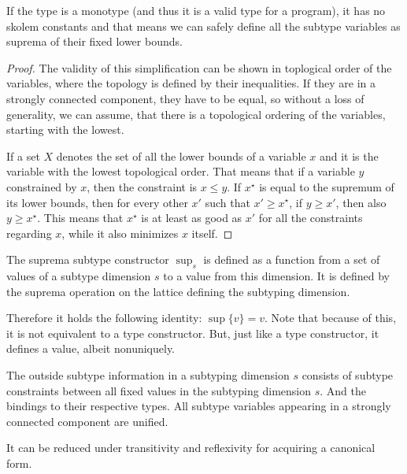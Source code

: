 \begin{remark}
    If the type is a monotype (and thus it is a valid type for a program), it has no skolem constants and that means we can safely define all the subtype variables as suprema of their fixed lower bounds.
\end{remark}

\begin{lemma}
    \label{suprema-subtyping}
\end{lemma}

\begin{proof}
The validity of this simplification can be shown in toplogical order of the variables, where the topology is defined by their inequalities. If they are in a strongly connected component, they have to be equal, so without a loss of generality, we can assume, that there is a topological ordering of the variables, starting with the lowest.

If a set $X$ denotes the set of all the lower bounds of a variable $x$ and it is the variable with the lowest topological order. That means that if a variable $y$ constrained by $x$, then the constraint is $x \leq y$. If $x^\star$ is equal to the supremum of its lower bounds, then for every other $x'$ such that $x' \geq x^\star$, if $y \geq x'$, then also $y \geq x^\star$. This means that $x^\star$ is at least as good as $x'$ for all the constraints regarding $x$, while it also minimizes $x$ itself.
\end{proof}

\begin{defn}
    The suprema subtype constructor $\sup_s$ is defined as a function from a set of values of a subtype dimension $s$ to a value from this dimension. It is defined by the suprema operation on the lattice defining the subtyping dimension.

    Therefore it holds the following identity: $\sup \{v\} = v$. Note that because of this, it is not equivalent to a type constructor. But, just like a type constructor, it defines a value, albeit nonuniquely.
\end{defn}

\begin{defn}
    The outside subtype information in a subtyping dimension $s$ consists of subtype constraints between all fixed values in the subtyping dimension $s$. And the bindings to their respective types. All subtype variables appearing in a strongly connected component are unified.

    It can be reduced under transitivity and reflexivity for acquiring a canonical form.
\end{defn}

